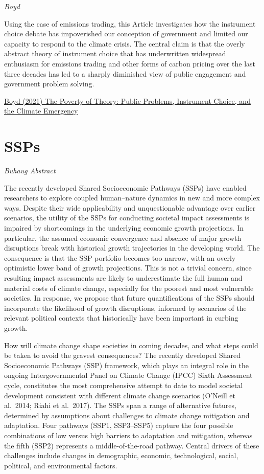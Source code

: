 \documentclass[
]{book}
\begin{document}
\emph{Boyd}

Using the case of emissions trading, this Article investigates how the instrument choice debate has impoverished our conception of government and limited our capacity to respond to the climate crisis. The central claim is that the overly abstract theory of instrument choice that has underwritten widespread enthusiasm for emissions trading and other forms of carbon pricing over the last three decades has led to a sharply diminished view of public engagement and government problem solving.

\href{https://journals.library.columbia.edu/index.php/cjel/article/view/8401/4300}{Boyd (2021) The Poverty of Theory: Public Problems, Instrument Choice, and the Climate Emergency}

\hypertarget{ssps}{%
\section{SSPs}\label{ssps}}

\emph{Buhaug Abstract}

The recently developed Shared Socioeconomic Pathways (SSPs) have enabled researchers to explore coupled human--nature dynamics in new and more complex ways. Despite their wide applicability and unquestionable advantage over earlier scenarios, the utility of the SSPs for conducting societal impact assessments is impaired by shortcomings in the underlying economic growth projections. In particular, the assumed economic convergence and absence of major growth disruptions break with historical growth trajectories in the developing world. The consequence is that the SSP portfolio becomes too narrow, with an overly optimistic lower band of growth projections. This is not a trivial concern, since resulting impact assessments are likely to underestimate the full human and material costs of climate change, especially for the poorest and most vulnerable societies. In response, we propose that future quantifications of the SSPs should incorporate the likelihood of growth disruptions, informed by scenarios of the relevant political contexts that historically have been important in curbing growth.

How will climate change shape societies in coming decades, and what steps could be taken to avoid the gravest consequences? The recently developed Shared Socioeconomic Pathways (SSP) framework, which plays an integral role in the ongoing Intergovernmental Panel on Climate Change (IPCC) Sixth Assessment cycle, constitutes the most comprehensive attempt to date to model societal development consistent with different climate change scenarios (O'Neill et al.~2014; Riahi et al.~2017). The SSPs span a range of alternative futures, determined by assumptions about challenges to climate change mitigation and adaptation. Four pathways (SSP1, SSP3--SSP5) capture the four possible combinations of low versus high barriers to adaptation and mitigation, whereas the fifth (SSP2) represents a middle-of-the-road pathway. Central drivers of these challenges include changes in demographic, economic, technological, social, political, and environmental factors.
\end{document}
